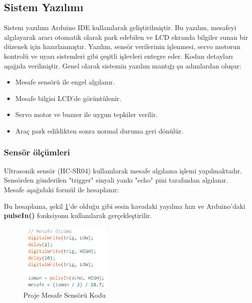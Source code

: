 \subsection{Sistem Yazılımı}
    Sistem yazılımı Arduino IDE kullanılarak geliştirilmiştir. Bu yazılım, mesafeyi algılayarak aracı otomatik olarak park edebilen ve LCD ekranda bilgiler sunan bir düzenek için hazırlanmıştır. Yazılım, sensör verilerinin işlenmesi, servo motorun kontrolü ve uyarı sistemleri gibi çeşitli işlevleri entegre eder. Kodun detayları aşağıda verilmiştir. Genel olarak sistemin yazılım mantığı şu adımlardan oluşur:
    \begin{itemize}
        \item Mesafe sensörü ile engel algılanır.
        \item Mesafe bilgisi LCD’de görüntülenir.
        \item Servo motor ve buzzer ile uygun tepkiler verilir.
        \item Araç park edildikten sonra normal duruma geri dönülür.
    \end{itemize}
    
\subsubsection{Sensör ölçümleri}
    Ultrasonik sensör (HC-SR04) kullanılarak mesafe algılama işlemi yapılmaktadır. Sensörden gönderilen "trigger" sinyali yankı "echo" pini tarafından algılanır. Mesafe aşağıdaki formül ile hesaplanır:

    Bu hesaplama, şekil \ref{fig:31}'de olduğu gibi sesin havadaki yayılma hızı ve Arduino’daki \textbf{pulseIn()} fonksiyonu kullanılarak gerçekleştirilir.

\begin{figure}[H]
\centering
\includegraphics[width=0.40\textwidth]{Resimler/31.png}
\caption{Proje Mesafe Sensörü Kodu}
\label{fig:31}
\end{figure}

